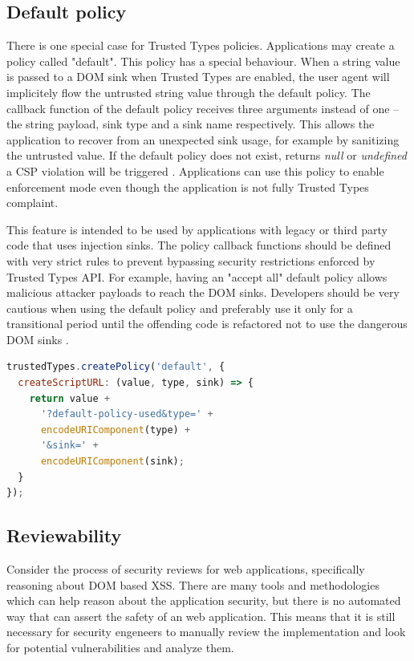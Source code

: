 \subsection{Default policy}

There is one special case for Trusted Types policies. Applications may create a policy called
"default". This policy has a special behaviour. When a string value is passed to a DOM sink when
Trusted Types are enabled, the user agent will implicitely flow the untrusted string value through
the default policy. The callback function of the default policy receives three arguments instead of
one -- the string payload, sink type and a sink name respectively. This allows the application to
recover from an unexpected sink usage, for example by sanitizing the untrusted value. If the default
policy does not exist, returns \textit{null} or \textit{undefined} a CSP violation will be triggered
\cite{tt_spec:default_policy}. Applications can use this policy to enable enforcement mode even
though the application is not fully Trusted Types complaint.

This feature is intended to be used by applications with legacy or third party code that uses
injection sinks. The policy callback functions should be defined with very strict rules to prevent
bypassing security restrictions enforced by Trusted Types API. For example, having an "accept all"
default policy allows malicious attacker payloads to reach the DOM sinks. Developers should be very
cautious when using the default policy and preferably use it only for a transitional period until
the offending code is refactored not to use the dangerous DOM sinks \cite{tt_spec:default_policy}.

\bigskip
\begin{lstlisting}[language=JavaScript, caption=Creating a default policy \cite{tt_spec:default_policy}]
trustedTypes.createPolicy('default', {
  createScriptURL: (value, type, sink) => {
    return value +
      '?default-policy-used&type=' +
      encodeURIComponent(type) +
      '&sink=' +
      encodeURIComponent(sink);
  }
});
\end{lstlisting}

\subsection{Reviewability}

Consider the process of security reviews for web applications, specifically reasoning about DOM
based XSS. There are many tools and methodologies which can help reason about the application
security, but there is no automated way that can assert the safety of an web application. This means that
it is still necessary for security engeneers to manually review the implementation and look for
potential vulnerabilities and analyze them.

